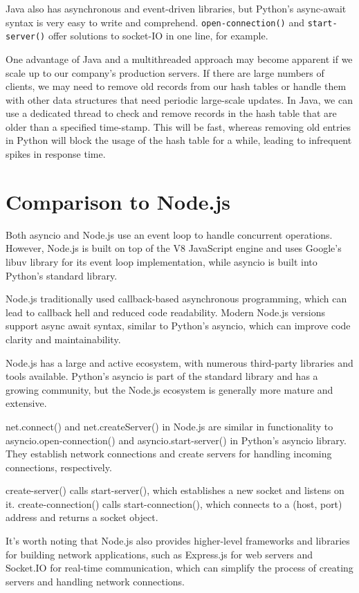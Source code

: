 Java also has asynchronous and event-driven libraries, but Python's async-await syntax is very easy to write and comprehend. \texttt{open-connection()} and \texttt{start-server()} offer solutions to socket-IO in one line, for example. 

One advantage of Java and a multithreaded approach may become apparent if we scale up to our company's production servers. If there are large numbers of clients, we may need to remove old records from our hash tables or handle them with other data structures that need periodic large-scale updates. In Java, we can use a dedicated thread to check and remove records in the hash table that are older than a specified time-stamp. This will be fast, whereas removing old entries in Python will block the usage of the hash table for a while, leading to infrequent spikes in response time.

\section{Comparison to Node.js}
Both asyncio and Node.js use an event loop to handle concurrent operations. However, Node.js is built on top of the V8 JavaScript engine and uses Google's libuv library for its event loop implementation, while asyncio is built into Python's standard library.

Node.js traditionally used callback-based asynchronous programming, which can lead to callback hell and reduced code readability. Modern Node.js versions support async await syntax, similar to Python's asyncio, which can improve code clarity and maintainability.

Node.js has a large and active ecosystem, with numerous third-party libraries and tools available. Python's asyncio is part of the standard library and has a growing community, but the Node.js ecosystem is generally more mature and extensive.

net.connect() and net.createServer() in Node.js are similar in functionality to asyncio.open-connection() and asyncio.start-server() in Python's asyncio library. They establish network connections and create servers for handling incoming connections, respectively.

create-server() calls start-server(), which establishes a new socket and listens on it. create-connection() calls start-connection(), which connects to a (host, port) address and returns a socket object.

It's worth noting that Node.js also provides higher-level frameworks and libraries for building network applications, such as Express.js for web servers and Socket.IO for real-time communication, which can simplify the process of creating servers and handling network connections.

